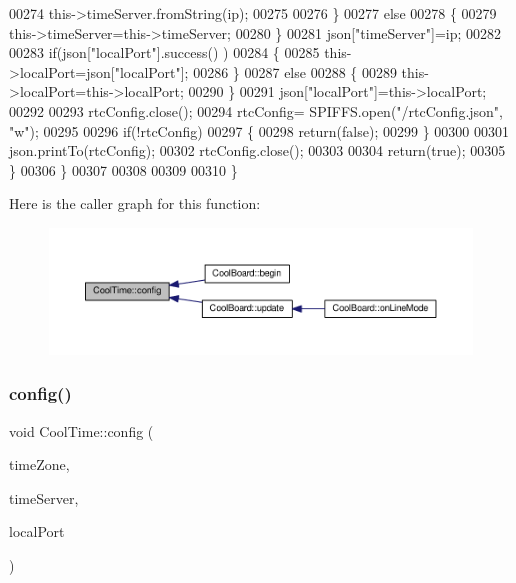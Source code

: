 \begin{DoxyCode}
00274                 this->timeServer.fromString(ip);
00275                 
00276             \}
00277             \textcolor{keywordflow}{else}
00278             \{
00279                 this->timeServer=this->timeServer;
00280             \}
00281             json[\textcolor{stringliteral}{"timeServer"}]=ip;
00282             
00283             \textcolor{keywordflow}{if}(json[\textcolor{stringliteral}{"localPort"}].success() )
00284             \{                       
00285                 this->localPort=json[\textcolor{stringliteral}{"localPort"}];
00286             \}
00287             \textcolor{keywordflow}{else}
00288             \{
00289                 this->localPort=this->localPort;
00290             \}
00291             json[\textcolor{stringliteral}{"localPort"}]=this->localPort;
00292 
00293             rtcConfig.close();
00294             rtcConfig= SPIFFS.open(\textcolor{stringliteral}{"/rtcConfig.json"}, \textcolor{stringliteral}{"w"});
00295             
00296             \textcolor{keywordflow}{if}(!rtcConfig)
00297             \{
00298                 \textcolor{keywordflow}{return}(\textcolor{keyword}{false});
00299             \}
00300             
00301             json.printTo(rtcConfig);
00302             rtcConfig.close();
00303                         
00304             \textcolor{keywordflow}{return}(\textcolor{keyword}{true}); 
00305         \}
00306     \}   
00307 
00308 
00309 
00310 \}
\end{DoxyCode}
Here is the caller graph for this function\+:\nopagebreak
\begin{figure}[H]
\begin{center}
\leavevmode
\includegraphics[width=350pt]{class_cool_time_a87c28260c1bc77091162cbcf1ee2e129_icgraph}
\end{center}
\end{figure}
\mbox{\label{class_cool_time_ae5528ed0ba9e78c711084968054950e0}} 
\subsubsection{\texorpdfstring{config()}{config()}\hspace{0.1cm}{\footnotesize\ttfamily [2/2]}}
{\footnotesize\ttfamily void Cool\+Time\+::config (\begin{DoxyParamCaption}\item[{int}]{time\+Zone,  }\item[{I\+P\+Address}]{time\+Server,  }\item[{unsigned int}]{local\+Port }\end{DoxyParamCaption})}

